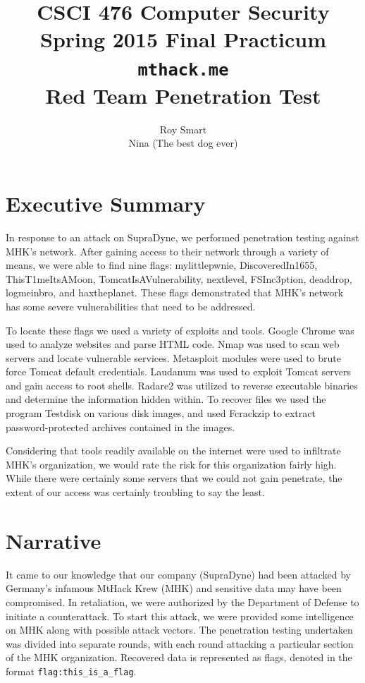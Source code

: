 \documentclass[10pt,a4paper,titlepage]{article}
\author{Roy Smart \\ Nina (The best dog ever)}
\title{CSCI 476 Computer Security \\ Spring 2015 Final Practicum \\ \texttt{mthack.me} \\ Red Team Penetration Test}
\begin{document}
\maketitle

\tableofcontents

\section{Executive Summary}
In response to an attack on SupraDyne, we performed penetration testing against MHK's network. After gaining access to their network through a variety of means, we were able to find nine flags: mylittlepwnie, DiscoveredIn1655, ThisT1meItsAMoon, TomcatIsAVulnerability, nextlevel, FSInc3ption, deaddrop, logmeinbro, and haxtheplanet. These flags demonstrated that MHK's network has some severe vulnerabilities that need to be addressed.

To locate these flags we used a variety of exploits and tools. Google Chrome was used to analyze websites and parse HTML code. Nmap was used to scan web servers and locate vulnerable services. Metasploit modules were used to brute force Tomcat default credentials. Laudanum was used to exploit Tomcat servers and gain access to root shells. Radare2 was utilized to reverse executable binaries and determine the information hidden within. To recover files we used the program Testdisk on various disk images, and used Fcrackzip to extract password-protected archives contained in the images.

Considering that tools readily available on the internet were used to infiltrate MHK's organization, we would rate the risk for this organization fairly high. While there were certainly some servers that we could not gain penetrate, the extent of our access was certainly troubling to say the least.
\section{Narrative}
It came to our knowledge that our company (SupraDyne) had been attacked by Germany's infamous MtHack Krew (MHK) and sensitive data may have been compromised. In retaliation, we were authorized by the Department of Defense to initiate a counterattack. To start this attack, we were provided some intelligence on MHK along with possible attack vectors\cite{test}. The penetration testing undertaken was divided into separate rounds, with each round attacking a particular section of the MHK organization. Recovered data is represented as flags, denoted in the format \texttt{flag:this\_is\_a\_flag}.
\end{document}
